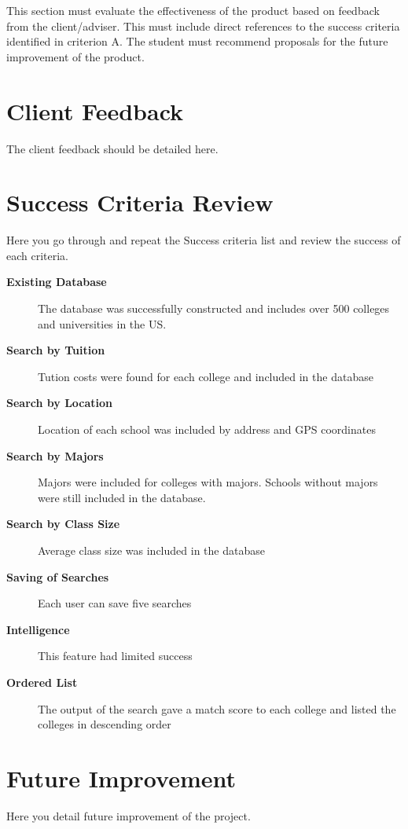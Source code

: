 \documentclass{tufte-book}
\begin{document}
This section must evaluate the effectiveness of the product based on feedback from the client/adviser. This must include direct references to the success criteria identified in criterion A.
The student must recommend proposals for the future improvement of the product.

\section{Client Feedback}
The client feedback should be detailed here.

\section{Success Criteria Review}
Here you go through and repeat the Success criteria list and review the success of each criteria.
\begin{description}
\item[\textbf{Existing Database}]  The database was successfully constructed and includes over 500 colleges and universities in the US.
\item[\textbf{Search by Tuition}] Tution costs were found for each college and included in the database
\item[\textbf{Search by Location}] Location of each school was included by address and GPS coordinates
\item[\textbf{Search by Majors}] Majors were included for colleges with majors.  Schools without majors were still included in the database.
\item[\textbf{Search by Class Size}] Average class size was included in the database
\item[\textbf{Saving of Searches}]  Each user can save five searches 
\item[\textbf{Intelligence}] This feature had limited success
\item[\textbf{Ordered List}] The output of the search gave a match score to each college and listed the colleges in descending order
\end{description}
\cite{Tufte2001}

\section{Future Improvement}
Here you detail future improvement of the project.
\cite{Tufte2006}

\backmatter





\printindex
\end{document}
